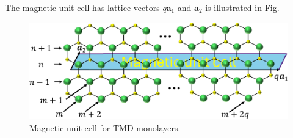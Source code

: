 \documentclass{report}
\begin{document}
The magnetic unit cell has lattice vectors $q\mathbf{a}_{1}$ and $\mathbf{a}_{2}$ is illustrated in Fig.
\begin{figure}[H]
	\centering
	\includegraphics[width=\linewidth]{pic/magneticUC_cut.pdf}
	\caption[Magnetic unit cell for TMD monolayers.]{\label{fig:Mag UC}Magnetic unit cell for TMD monolayers.}
\end{figure}
\end{document}
